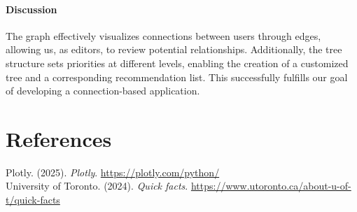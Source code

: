 \documentclass[fontsize=11pt]{article}
\begin{document}
\paragraph{Discussion}
The graph effectively visualizes connections between users through edges, allowing us, as editors, to review potential relationships. Additionally, the tree structure sets priorities at different levels, enabling the creation of a customized tree and a corresponding recommendation list. This successfully fulfills our goal of developing a connection-based application.

\section*{References}

Plotly. (2025). \textit{Plotly}.
\url{https://plotly.com/python/}
\\
University of Toronto. (2024). \textit{Quick facts}.
\url{https://www.utoronto.ca/about-u-of-t/quick-facts}


\end{document}
